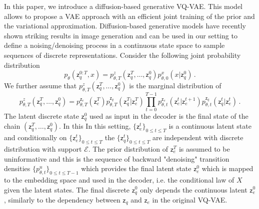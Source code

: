 \documentclass{article}
\newcommand{\latentdis}{\mathsf{z}_q}
\newcommand{\latentcont}{\mathsf{z}_e}
\newcommand{\embedspace}{\mathcal{E}}
\begin{document}
In this paper, we introduce a diffusion-based generative VQ-VAE. This model allows to propose a VAE approach with an efficient joint training of the prior and the variational approximation. Diffusion-based generative models have recently shown striking results in image generation and can be used in our setting to define a noising/denoising process in a continuous state space to sample sequences of discrete representations. Consider the following joint probability distribution 
$$
p_{\theta}(\latentdis^{0:T},x) = p^z_{\theta,T}(\latentdis^T,\ldots,\latentdis^0)p^x_{\theta,0}(x|\latentdis^{0})\,.
$$ 
We further assume that $p^z_{\theta,T}(\latentdis^T,\ldots,\latentdis^0)$ is the marginal distribution of  
$$
p^z_{\theta,T}(\latentdis^T,\ldots,\latentdis^0) %
= p^{\latentcont}_{\theta,T}(\latentcont^T) p^{\latentdis}_{\theta,T}(\latentdis^T|\latentcont^T)\prod_{t=0}^{T-1}p^{\latentcont}_{\theta,t}(\latentcont^t|\latentcont^{t+1})p^{\latentdis}_{\theta,t}(\latentdis^t|\latentcont^t)\,.
$$
The latent discrete state $\latentdis^0$ used as input in the decoder  is the final state of the chain $(\latentdis^T,\ldots,\latentdis^0)$. In this 
In this setting, $\{\latentcont^t\}_{0\leqslant t\leqslant T}$ is a continuous latent state and conditionally on $\{\latentcont^t\}_{0\leqslant t\leqslant T}$ the $\{\latentdis^t\}_{0\leqslant t\leqslant T}$ are independent with discrete distribution with support $\embedspace$. The prior distribution of  $\latentcont^T$ is assumed to be uninformative and this is the sequence of backward "denoising" transition densities $\{p^u_{\theta,t}\}_{0\leqslant t\leqslant T-1}$ which provides the final latent state $\latentcont^0$ which is mapped to the embedding space and used in the decoder, i.e. the conditional law of $X$ given the latent states. The final discrete $\latentdis^0$ only depends the continuous latent $\latentcont^0$, similarly to the dependency between $\latentdis$ and $\latentcont$ in the original VQ-VAE.
\end{document}
